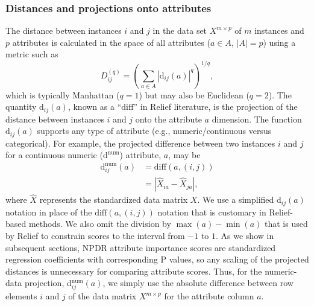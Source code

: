 \documentclass[10pt]{article}
\begin{document}
\subsubsection{Distances and projections onto attributes}
The distance between instances $i$ and $j$ in the data set $X^{m \times p}$ of $m$ instances and $p$ attributes is calculated in the space of all attributes ($a \in A$, $|A|=p$) using a metric such as
\begin{equation}\label{eq:D}
D^{(q)}_{ij}=\left(\sum_{a\in A}|\text{d}_{ij}(a)|^q\right)^{1/q},
\end{equation}
which is typically Manhattan ($q=1$) but may also be Euclidean ($q=2$).
The quantity 
$\text{d}_{ij}(a)$,
known as a ``$\text{diff}$'' in Relief literature, is the projection of the distance between instances $i$ and $j$ onto the attribute $a$ dimension.
The function $\text{d}_{ij}(a)$ supports any type of attribute (e.g., numeric/continuous versus categorical).
For example, the projected difference between two instances $i$ and $j$ for a continuous numeric ($\text{d}^{\text{num}}$) attribute, $a$, may be
\begin{equation}\label{eq:diff}
\begin{aligned}
\text{d}^{\text{num}}_{ij}(a)&=\text{diff}(a,(i,j))\\
                                            & = {|\hat{X}_{ia}-\hat{X}_{ja}|},
\end{aligned}
\end{equation}
where $\hat{X}$ represents the standardized data matrix $X$.
We use a simplified d$_{ij}(a)$ notation in place of the $\text{diff}(a,(i,j))$ notation that is customary in Relief-based methods.
We also omit the division by $\max(a)-\min(a)$ that is used by Relief to constrain scores to the interval from $-1$ to $1$.
As we show in subsequent sections, NPDR attribute importance scores are standardized regression coefficients with corresponding P values, so any scaling of the projected distances is unnecessary for comparing attribute scores.
Thus, for the numeric-data projection, d$^{\text{num}}_{ij}(a)$, we simply use the absolute difference between row elements $i$ and $j$ of the data matrix $X^{m \times p}$ for the attribute column $a$.
\end{document}
